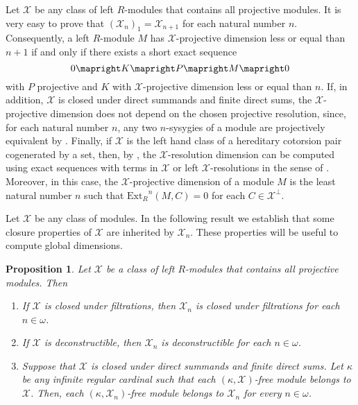\documentclass[a4paper,10pt]{amsart}
\newtheorem{proposition}[definition]{Proposition}
\begin{document}
Let $\mathcal X$ be any class of left $R$-modules that contains all
projective modules. It is very easy to prove that $\left(\mathcal
  X_n\right)_1 = \mathcal X_{n+1}$ for each natural number
$n$. Consequently, a left $R$-module $M$ has $\mathcal X$-projective dimension
less or equal than $n+1$ if and only if there exists a short exact
sequence
\begin{displaymath}
  0 \mapright K \mapright P \mapright M \mapright 0
\end{displaymath}
with $P$ projective and $K$ with $\mathcal X$-projective dimension
less or equal than $n$. If, in addition, $\mathcal X$ is closed under
direct summands and finite direct sums, the $\mathcal X$-projective
dimension does not depend on the chosen projective resolution, since,
for each natural number $n$, any two $n$-sysygies of a module are
projectively equivalent by \cite[Proposition 8.5]{Rotman}. Finally, if
$\mathcal X$ is the left hand class of a hereditary cotorsion pair
cogenerated by a set, then, by \cite[Proposition
1.11]{EstradaGuilIzurdiaga}, the $\mathcal X$-resolution dimension can
be computed using exact sequences with terms in $\mathcal X$ or left
$\mathcal X$-resolutions in the sense of \cite[Definition
8.1.2]{EnochsJenda}. Moreover, in this case, the $\mathcal
X$-projective dimension of a module $M$ is the least natural number
$n$ such that ${\textrm{Ext}_R}^n(M,C) = 0$ for each $C \in \mathcal X^\perp$.

Let $\mathcal X$ be any class of modules. In the following result we establish that some closure properties of $\mathcal X$ are
inherited by $\mathcal X_n$. These properties will be useful to
compute global dimensions.

\begin{proposition}\label{p:ClosedUnderFiltrations}
  Let $\mathcal X$ be a class of left $R$-modules that contains all
  projective modules. Then
  \begin{enumerate}
  \item If $\mathcal X$ is closed under filtrations, then $\mathcal
    X_n$ is closed under filtrations for each $n \in \omega$.

  \item If $\mathcal X$ is deconstructible, then $\mathcal X_n$ is
    deconstructible for each $n \in \omega$.

  \item Suppose that $\mathcal X$ is closed under direct summands and
    finite direct sums. Let $\kappa$ be any infinite regular cardinal such
    that each $(\kappa, \mathcal X)$-free module belongs to $\mathcal
    X$. Then, each $(\kappa,\mathcal X_n)$-free module belongs to
    $\mathcal X_n$ for every $n \in \omega$.
  \end{enumerate}
\end{proposition}
\end{document}
